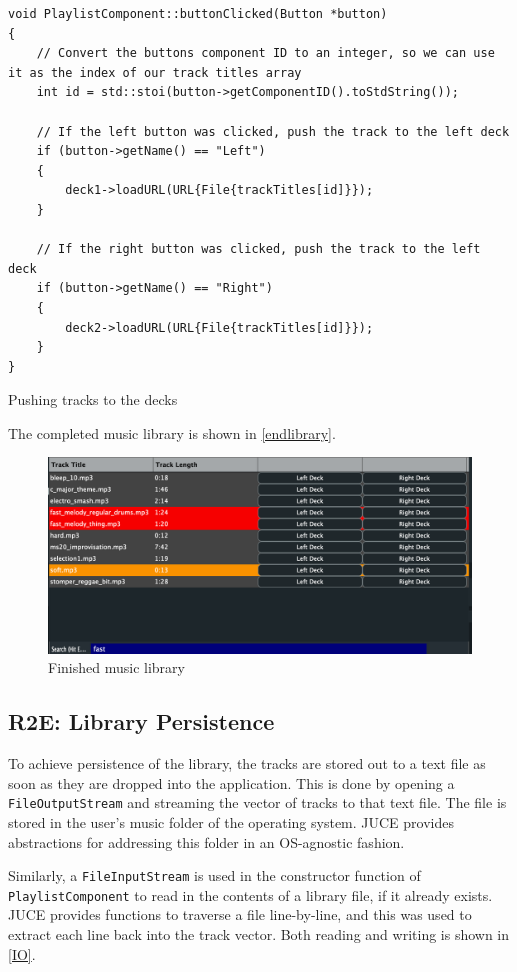 \begin{listing}
	\begin{verbatim}
void PlaylistComponent::buttonClicked(Button *button)
{
	// Convert the buttons component ID to an integer, so we can use it as the index of our track titles array
	int id = std::stoi(button->getComponentID().toStdString());

	// If the left button was clicked, push the track to the left deck
	if (button->getName() == "Left")
	{
		deck1->loadURL(URL{File{trackTitles[id]}});
	}

	// If the right button was clicked, push the track to the left deck
	if (button->getName() == "Right")
	{
		deck2->loadURL(URL{File{trackTitles[id]}});
	}
}
	\end{verbatim}
	\caption{Pushing tracks to the decks}
	\label{deckpush}
\end{listing}

The completed music library is shown in \autoref{endlibrary}.

\begin{figure}[H]
	\centering
	\includegraphics[width=12cm]{endlibrary.png}
	\caption{Finished music library}
	\label{endlibrary}
\end{figure}


\subsection{R2E: Library Persistence}
To achieve persistence of the library, the tracks are stored out to a text file as soon as they are dropped into the application. This is done by opening a \texttt{FileOutputStream} and streaming the vector of tracks to that text file. The file is stored in the user's music folder of the operating system. JUCE provides abstractions for addressing this folder in an OS-agnostic fashion.

Similarly, a \texttt{FileInputStream} is used in the constructor function of \texttt{PlaylistComponent} to read in the contents of a library file, if it already exists. JUCE provides functions to traverse a file line-by-line, and this was used to extract each line back into the track vector. Both reading and writing is shown in \autoref{IO}.

